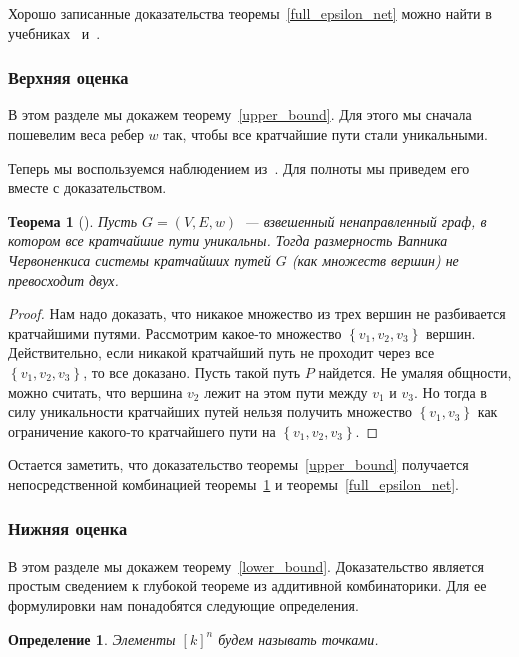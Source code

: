\documentclass[12pt]{article}
\newcommand{\set}[1]{\left\{#1\right\}}
\DeclareRobustCommand*{\CC}{\,\textendash\,\hskip 0pt}
\newtheorem{definition}{Определение}
\newtheorem{theorem}{Теорема}
\begin{document}
    Хорошо записанные доказательства теоремы~\ref{full_epsilon_net} можно найти в учебниках~\cite{AS92} и~\cite{M02}.
    \subsubsection{Верхняя оценка}
    \label{subsubsection_upper_bound}
    В этом разделе мы докажем теорему~\ref{upper_bound}.
    Для этого мы сначала пошевелим веса ребер $w$ так, чтобы все кратчайшие пути стали уникальными.

    Теперь мы воспользуемся наблюдением из~\cite{ADFGW11}. Для полноты мы приведем его вместе с доказательством.
    \begin{theorem}[\cite{ADFGW11}]
        \label{unique_vc_dimension}
        Пусть $G = (V, E, w)$~--- взвешенный ненаправленный граф, в котором все кратчайшие пути уникальны.
        Тогда размерность Вапника\CC Червоненкиса системы кратчайших путей $G$ (как множеств вершин)
        не превосходит двух.
    \end{theorem}
    \begin{proof}
        Нам надо доказать, что никакое множество из трех вершин не разбивается кратчайшими путями.
        Рассмотрим какое-то множество $\set{v_1, v_2, v_3}$ вершин.
        Действительно, если никакой кратчайший путь не проходит через все $\set{v_1, v_2, v_3}$, то все доказано.
        Пусть такой путь $P$ найдется. Не умаляя общности, можно считать, что вершина $v_2$ лежит на этом пути между
        $v_1$ и $v_3$. Но тогда в силу уникальности кратчайших путей нельзя получить множество $\set{v_1, v_3}$
        как ограничение какого-то кратчайшего пути на $\set{v_1, v_2, v_3}$.
    \end{proof}

    Остается заметить, что доказательство теоремы~\ref{upper_bound} получается непосредственной комбинацией
    теоремы~\ref{unique_vc_dimension} и теоремы~\ref{full_epsilon_net}.
    \subsubsection{Нижняя оценка}
    \label{subsubsection_lower_bound}
    В этом разделе мы докажем теорему~\ref{lower_bound}.
    Доказательство является простым сведением к глубокой теореме из аддитивной комбинаторики. Для ее формулировки нам
    понадобятся следующие определения.

    \begin{definition}
        Элементы $[k]^n$ будем называть \emph{точками}.
    \end{definition}
\end{document}
